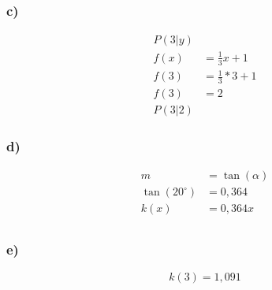 \documentclass[a4paper]{article}
\begin{document}
		\begin{minipage}{0.5\textwidth}
			\vspace*{10mm}
			\subsubsection*{c)}
				\begin{align*}
					\text{$P (3|y)$} \\
					f(x) &= \frac{1}{3}x + 1 \\
					f(3) &= \frac{1}{3} * 3 + 1 \\
					f(3) &= 2 \\
					\text{$P (3|2)$}
				\end{align*}
			\subsubsection*{d)}
			\begin{align*}
				m &= \tan(\alpha) \\
				\tan(20^{\circ}) &= 0,364\\
				k(x) &= 0,364x \\ 
			\end{align*}
			\subsubsection*{e)}
				\[k(3)= 1,091 \] \\
				\hspace*{10mm}
		\end{minipage}
	\clearpage
\end{document}
